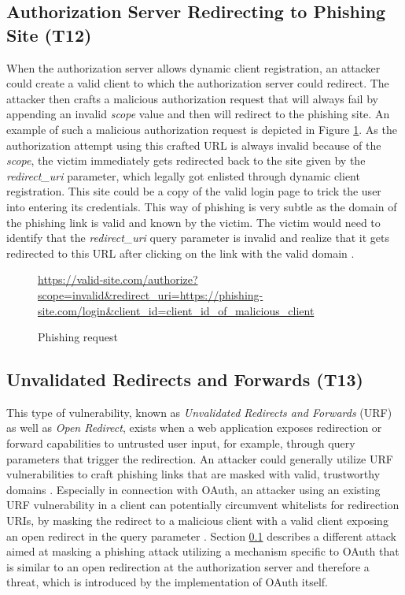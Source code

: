 \subsection[Authorization Server Redirecting to Phishing Site]{Authorization Server Redirecting to Phishing Site (T12)}
\label{threat:T12}
When the authorization server allows dynamic client registration, an attacker could create a valid client to which the authorization server could redirect. The attacker then crafts a malicious authorization request that will always fail by appending an invalid \emph{scope} value and then will redirect to the phishing site. An example of such a malicious authorization request is depicted in Figure \ref{fig:phishing_requests}. As the authorization attempt using this crafted URL is always invalid because of the \emph{scope}, the victim immediately gets redirected back to the site given by the \emph{redirect\_uri} parameter, which legally got enlisted through dynamic client registration. This site could be a copy of the valid login page to trick the user into entering its credentials. This way of phishing is very subtle as the domain of the phishing link is valid and known by the victim. The victim would need to identify that the \emph{redirect\_uri} query parameter is invalid and realize that it gets redirected to this URL after clicking on the link with the valid domain \cite{lodderstedt2020oauth}.


\begin{figure}[ht]
	\sffamily\footnotesize
	\url{https://valid-site.com/authorize?scope=invalid&redirect_uri=https://phishing-site.com/login&client_id=client_id_of_malicious_client}
	\linethickness{0.4pt}
	\caption{Phishing request}
	\label{fig:phishing_requests}
\end{figure}

\subsection[Unvalidated Redirects and Forwards]{Unvalidated Redirects and Forwards (T13)}
\label{threat:T13}
This type of vulnerability, known as \emph{Unvalidated Redirects and Forwards} (URF) as well as \emph{Open Redirect}, exists when a web application exposes redirection or forward capabilities to untrusted user input, for example, through query parameters that trigger the redirection. An attacker could generally utilize URF vulnerabilities to craft phishing links that are masked with valid, trustworthy domains \cite{wang2015urfds}. Especially in connection with OAuth, an attacker using an existing URF vulnerability in a client can potentially circumvent whitelists for redirection URIs, by masking the redirect to a malicious client with a valid client exposing an open redirect in the query parameter \cite{lodderstedt2020oauth}. Section \ref{threat:T12} describes a different attack aimed at masking a phishing attack utilizing a mechanism specific to OAuth that is similar to an open redirection at the authorization server and therefore a threat, which is introduced by the implementation of OAuth itself.

